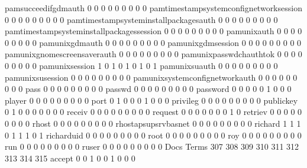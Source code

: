 \documentclass[compress,8pt]{beamer}
\begin{document}
\begin{frame}
\begin{Schunk}
  pamsucceedifgdmauth                        0   0   0   0   0   0   0   0   0
  pamtimestampsystemconfignetworksession     0   0   0   0   0   0   0   0   0
  pamtimestampsysteminstallpackagesauth      0   0   0   0   0   0   0   0   0
  pamtimestampsysteminstallpackagessession   0   0   0   0   0   0   0   0   0
  pamunixauth                                0   0   0   0   0   0   0   0   0
  pamunixgdmauth                             0   0   0   0   0   0   0   0   0
  pamunixgdmsession                          0   0   0   0   0   0   0   0   0
  pamunixgnomescreensaverauth                0   0   0   0   0   0   0   0   0
  pamunixpasswdchauthtok                     0   0   0   0   0   0   0   0   0
  pamunixsession                             1   0   1   0   1   0   1   0   1
  pamunixsuauth                              0   0   0   0   0   0   0   0   0
  pamunixsusession                           0   0   0   0   0   0   0   0   0
  pamunixsystemconfignetworkauth             0   0   0   0   0   0   0   0   0
  pass                                       0   0   0   0   0   0   0   0   0
  passwd                                     0   0   0   0   0   0   0   0   0
  password                                   0   0   0   0   0   1   0   0   0
  player                                     0   0   0   0   0   0   0   0   0
  port                                       0   1   0   0   0   1   0   0   0
  privileg                                   0   0   0   0   0   0   0   0   0
  publickey                                  0   1   0   0   0   0   0   0   0
  receiv                                     0   0   0   0   0   0   0   0   0
  request                                    0   0   0   0   0   0   0   1   0
  retriev                                    0   0   0   0   0   0   0   0   0
  rhost                                      0   0   0   0   0   0   0   0   0
  rhostapsupsrvbasnet                        0   0   0   0   0   0   0   0   0
  richard                                    1   1   1   0   1   1   1   0   1
  richarduid                                 0   0   0   0   0   0   0   0   0
  root                                       0   0   0   0   0   0   0   0   0
  roy                                        0   0   0   0   0   0   0   0   0
  run                                        0   0   0   0   0   0   0   0   0
  ruser                                      0   0   0   0   0   0   0   0   0
                                          Docs
Terms                                      307 308 309 310 311 312 313 314 315
  accept                                     0   0   1   0   0   1   0   0   0

\end{Schunk}
\end{frame}
\end{document}
